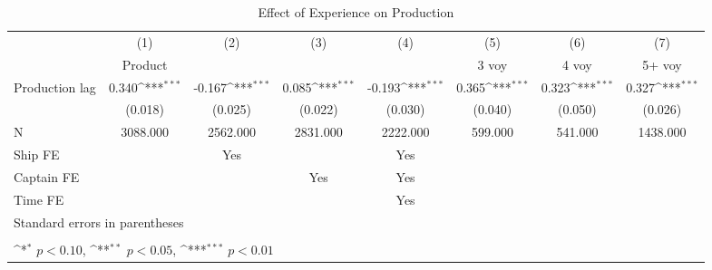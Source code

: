 \begin{table}[htbp]\centering
\def\sym#1{\ifmmode^{#1}\else\(^{#1}\)\fi}
\caption{Effect of Experience on Production}
\begin{tabular}{l*{7}{c}}
\hline\hline
                    &\multicolumn{1}{c}{(1)}&\multicolumn{1}{c}{(2)}&\multicolumn{1}{c}{(3)}&\multicolumn{1}{c}{(4)}&\multicolumn{1}{c}{(5)}&\multicolumn{1}{c}{(6)}&\multicolumn{1}{c}{(7)}\\
                    &\multicolumn{1}{c}{Product}&\multicolumn{1}{c}{} &\multicolumn{1}{c}{} &\multicolumn{1}{c}{} &\multicolumn{1}{c}{3 voy}&\multicolumn{1}{c}{4 voy}&\multicolumn{1}{c}{5+ voy}\\
\hline
Production lag      &       0.340\sym{***}&      -0.167\sym{***}&       0.085\sym{***}&      -0.193\sym{***}&       0.365\sym{***}&       0.323\sym{***}&       0.327\sym{***}\\
                    &     (0.018)         &     (0.025)         &     (0.022)         &     (0.030)         &     (0.040)         &     (0.050)         &     (0.026)         \\
\hline
N                   &    3088.000         &    2562.000         &    2831.000         &    2222.000         &     599.000         &     541.000         &    1438.000         \\
Ship FE             &                     &         Yes         &                     &         Yes         &                     &                     &                     \\
Captain FE          &                     &                     &         Yes         &         Yes         &                     &                     &                     \\
Time FE             &                     &                     &                     &         Yes         &                     &                     &                     \\
\hline\hline
\multicolumn{8}{l}{\footnotesize Standard errors in parentheses}\\
\multicolumn{8}{l}{\footnotesize  }\\
\multicolumn{8}{l}{\footnotesize \sym{*} \(p<0.10\), \sym{**} \(p<0.05\), \sym{***} \(p<0.01\)}\\
\end{tabular}
\end{table}
